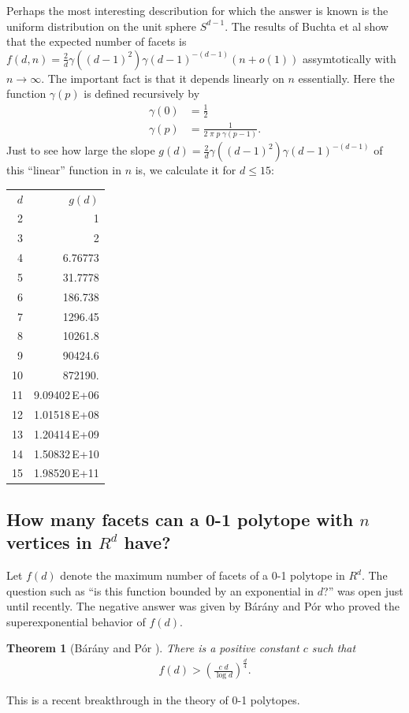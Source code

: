 \documentclass[[a4paper,12pt]{article}
\newtheorem{theorem}{Theorem}
\begin{document}
Perhaps the most interesting describution for which the answer
is known is the uniform distribution on the unit sphere $S^{d-1}$.
The results of Buchta et al \cite{bmt-sacb-85} show that the expected number
of facets is $f(d, n) = \frac{2}{d} \gamma((d-1)^2) \gamma(d-1)^{-(d-1)} (n + o(1))$
assymtotically with $n \rightarrow \infty$.
The important fact is that it depends linearly on $n$ essentially.
Here the function $\gamma(p)$ is defined recursively by
\begin{align*}
 \gamma(0) &=\frac{1}{2}\\
 \gamma(p) &=\frac{1}{2 \; \pi \;  p \; \gamma(p-1)}.
\end{align*}
\noindent
Just to see how large the slope $g(d)=\frac{2}{d} \gamma((d-1)^2) 
\gamma(d-1)^{-(d-1)}$ of this ``linear'' function in $n$ is, 
we calculate it for $d \le 15$:
\begin{center}
\begin{tabular}{rr}
$d$ & $g(d)$\\
2 & 1 \\ 3 & 2 \\ 4 & 6.76773 \\ 5 & 31.7778 \\ 6 & 
   186.738 \\ 7 & 1296.45 \\ 8 & 10261.8 \\ 9 & 90424.6 \\ 10 & 
   872190. \\ 11 & 9.09402\,E+06 \\ 12 & 1.01518\,E+08 \\ 13 & 
1.20414\,E+09 \\ 14 & 1.50832\,E+10 \\ 15 & 1.98520\,E+11
\end{tabular}
\end{center}

\subsection{How many facets can a 0-1 polytope with $n$ vertices in
$R^d$ have?}
\label{polytope:01Hcomplexity}

Let $f(d)$ denote the maximum number of facets of a
0-1 polytope in $R^d$.
The question such as ``is this function bounded by an exponential in $d$?''
was open just until recently.  The negative answer was given by
B\'ar\'any and P\'or who proved the superexponential behavior
of $f(d)$.
\begin{theorem}[B\'ar\'any and P\'or \cite{bp-01pmf-00}]
There is a positive constant $c$ such that
\begin{align}
f(d) > \left ( \frac{c\;d}{\log d} \right )^\frac{d}{4}.
\end{align}
\end{theorem} 
This is a recent breakthrough in the theory of 0-1 polytopes.
\end{document}
